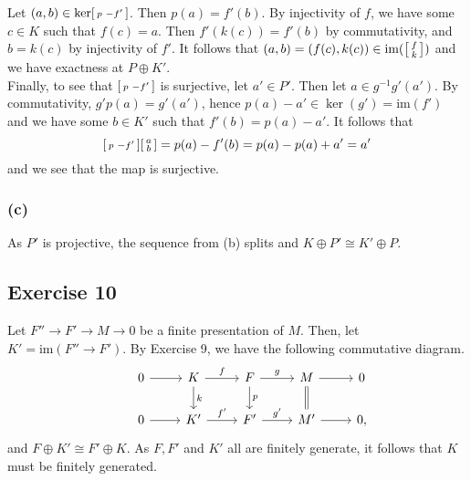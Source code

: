 \documentclass{article}
\theoremstyle{definition}
\newcommand{\im}{\text{im}}
\begin{document}
Let $(a, b) \in \ker \begin{bsmallmatrix} p & -f' \end{bsmallmatrix}$. Then
$p(a) = f'(b)$. By injectivity of $f$, we have some $c \in K$ such that $f(c) =
a$. Then $f'(k(c)) = f'(b)$ by commutativity, and $b = k(c)$ by injectivity of
$f'$. It follows that $(a, b) = (f(c), k(c)) \in \im(\begin{bsmallmatrix} f \\
k \end{bsmallmatrix})$ and we have exactness at $P \oplus K'$. \\

Finally, to see that $\begin{bsmallmatrix} p & -f' \end{bsmallmatrix}$ is
surjective, let $a' \in P'$. Then let $a \in g^{-1}g'(a')$. By commutativity,
$g'p(a) = g'(a')$, hence $p(a) - a' \in \ker(g') = \im(f')$ and we have some $b
\in K'$ such that $f'(b) = p(a) - a'$. It follows that
\[
	\begin{bsmallmatrix} p & -f' \end{bsmallmatrix}
	\begin{bsmallmatrix} a \\ b \end{bsmallmatrix}
	=
	p(a) - f'(b)
	=
	p(a) - p(a) + a' 
	= 
	a'
\]
and we see that the map is surjective.

\subsubsection*{(c)}

As $P'$ is projective, the sequence from (b) splits and $K \oplus P' \cong K' \oplus P$.

\subsection*{Exercise 10}

Let $F'' \to F' \to M \to 0$ be a finite presentation of $M$. Then, let $K' =
\im(F'' \to F')$. By Exercise 9, we have the following commutative diagram.
\[
\begin{tikzcd}
	& 0
	\arrow{r}
	& K
	\arrow{r}{f}
	\arrow{d}{k}
	& F
	\arrow{r}{g}
	\arrow{d}{p}
	& M
	\arrow{r}
	\arrow[equal]{d}
	& 0 \\
	& 0
	\arrow{r}
	& K'
	\arrow{r}{f'}
	& F'
	\arrow{r}{g'}
	& M'
	\arrow{r}
	& 0,
\end{tikzcd}
\]
and $F \oplus K' \cong F' \oplus K$. As $F, F'$ and $K'$ all are finitely
generate, it follows that $K$ must be finitely generated. \\
\end{document}
